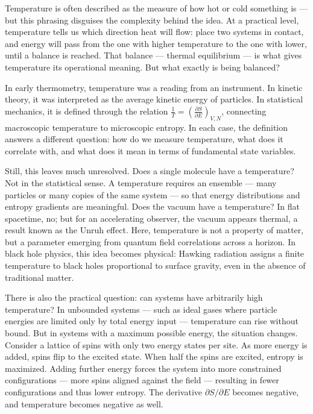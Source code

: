 
Temperature is often described as the measure of how hot or cold something is — but this phrasing disguises the complexity behind the idea. At a practical level, temperature tells us which direction heat will flow: place two systems in contact, and energy will pass from the one with higher temperature to the one with lower, until a balance is reached. That balance — thermal equilibrium — is what gives temperature its operational meaning. But what exactly is being balanced?

In early thermometry, temperature was a reading from an instrument. In kinetic theory, it was interpreted as the average kinetic energy of particles. In statistical mechanics, it is defined through the relation $ \frac{1}{T} = \left( \frac{\partial S}{\partial E} \right)_{V,N} $, connecting macroscopic temperature to microscopic entropy. In each case, the definition answers a different question: how do we measure temperature, what does it correlate with, and what does it mean in terms of fundamental state variables.

Still, this leaves much unresolved. Does a single molecule have a temperature? Not in the statistical sense. A temperature requires an ensemble — many particles or many copies of the same system — so that energy distributions and entropy gradients are meaningful. Does the vacuum have a temperature? In flat spacetime, no; but for an accelerating observer, the vacuum appears thermal, a result known as the Unruh effect. Here, temperature is not a property of matter, but a parameter emerging from quantum field correlations across a horizon. In black hole physics, this idea becomes physical: Hawking radiation assigns a finite temperature to black holes proportional to surface gravity, even in the absence of traditional matter.

There is also the practical question: can systems have arbitrarily high temperature? In unbounded systems — such as ideal gases where particle energies are limited only by total energy input — temperature can rise without bound. But in systems with a maximum possible energy, the situation changes. Consider a lattice of spins with only two energy states per site. As more energy is added, spins flip to the excited state. When half the spins are excited, entropy is maximized. Adding further energy forces the system into more constrained configurations — more spins aligned against the field — resulting in fewer configurations and thus lower entropy. The derivative $ \partial S/\partial E $ becomes negative, and temperature becomes negative as well.


